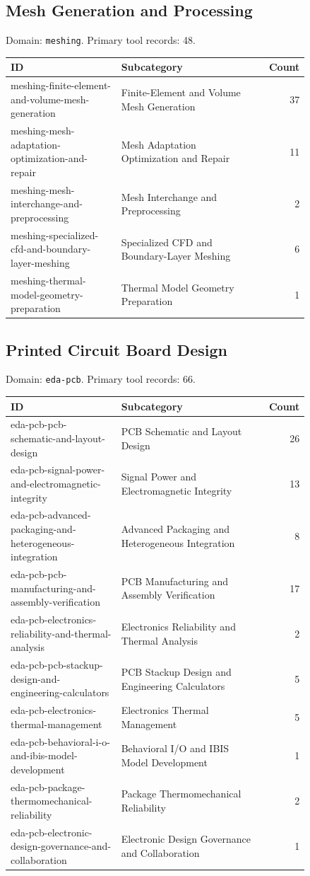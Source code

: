 \subsection{Mesh Generation and Processing}
\noindent Domain: \texttt{meshing}. Primary tool records: 48.
\begin{longtable}{p{0.37\linewidth}p{0.47\linewidth}r}
ID & Subcategory & Count\\\hline\endhead
meshing-finite-element-and-volume-mesh-generation & Finite-Element and Volume Mesh Generation & 37\\
meshing-mesh-adaptation-optimization-and-repair & Mesh Adaptation Optimization and Repair & 11\\
meshing-mesh-interchange-and-preprocessing & Mesh Interchange and Preprocessing & 2\\
meshing-specialized-cfd-and-boundary-layer-meshing & Specialized CFD and Boundary-Layer Meshing & 6\\
meshing-thermal-model-geometry-preparation & Thermal Model Geometry Preparation & 1\\
\end{longtable}
\subsection{Printed Circuit Board Design}
\noindent Domain: \texttt{eda-pcb}. Primary tool records: 66.
\begin{longtable}{p{0.37\linewidth}p{0.47\linewidth}r}
ID & Subcategory & Count\\\hline\endhead
eda-pcb-pcb-schematic-and-layout-design & PCB Schematic and Layout Design & 26\\
eda-pcb-signal-power-and-electromagnetic-integrity & Signal Power and Electromagnetic Integrity & 13\\
eda-pcb-advanced-packaging-and-heterogeneous-integration & Advanced Packaging and Heterogeneous Integration & 8\\
eda-pcb-pcb-manufacturing-and-assembly-verification & PCB Manufacturing and Assembly Verification & 17\\
eda-pcb-electronics-reliability-and-thermal-analysis & Electronics Reliability and Thermal Analysis & 2\\
eda-pcb-pcb-stackup-design-and-engineering-calculators & PCB Stackup Design and Engineering Calculators & 5\\
eda-pcb-electronics-thermal-management & Electronics Thermal Management & 5\\
eda-pcb-behavioral-i-o-and-ibis-model-development & Behavioral I/O and IBIS Model Development & 1\\
eda-pcb-package-thermomechanical-reliability & Package Thermomechanical Reliability & 2\\
eda-pcb-electronic-design-governance-and-collaboration & Electronic Design Governance and Collaboration & 1\\
\end{longtable}
